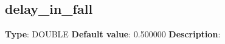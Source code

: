 \subsection*{delay_in_fall}
\textbf{Type}: DOUBLE\newline
\textbf{Default value}: 0.500000\newline
\textbf{Description}: